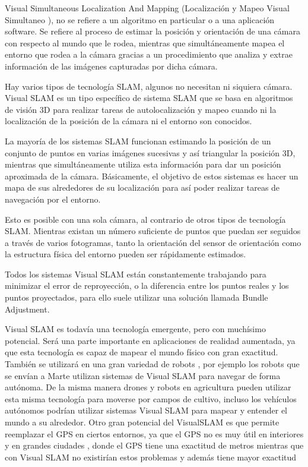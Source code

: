 Visual Simultaneous Localization And Mapping (Localización y Mapeo Visual Simultaneo ), no se refiere a un algoritmo en particular o a una aplicación software. Se refiere al proceso de estimar la posición y orientación de una cámara con respecto al mundo que le rodea, mientras que simultáneamente mapea el entorno que rodea a la cámara gracias a un procedimiento que analiza y extrae información de las imágenes capturadas por dicha cámara.

Hay varios tipos de tecnología SLAM, algunos no necesitan ni siquiera cámara. Visual SLAM es un tipo específico de sistema SLAM que se basa en algoritmos de visión 3D
para realizar tareas de autolocalización y mapeo cuando ni la localización de la posición de la cámara ni el entorno son conocidos.

La mayoría de los sistemas SLAM funcionan estimando la posición de un conjunto de puntos en varias imágenes sucesivas y así triangular la posición 3D, mientras que simultáneamente utiliza esta información para dar un posición aproximada de la cámara. Básicamente, el objetivo de estos sistemas es hacer un mapa de sus alrededores de su localización para así poder realizar tareas de navegación por el entorno.

Esto es posible con una sola cámara, al contrario de otros tipos de tecnología SLAM. Mientras existan un número suficiente de puntos que puedan ser seguidos a través de varios fotogramas, tanto la orientación del sensor de orientación como la estructura física del entorno pueden ser rápidamente estimados.

Todos los sistemas Visual SLAM están constantemente trabajando para minimizar el error de reproyección, o la diferencia entre los puntos reales y los puntos proyectados, para ello suele utilizar una solución llamada Bundle Adjustment.

Visual SLAM es todavía una tecnología emergente, pero con muchísimo potencial. Será una parte importante en aplicaciones de realidad aumentada, ya que esta tecnología es capaz de mapear el mundo físico con gran exactitud. También se utilizará en una gran variedad de robots , por ejemplo los robots que se envían a Marte utilizan sistemas de Visual SLAM para navegar de forma autónoma. De la misma manera drones y robots en agricultura pueden utilizar esta misma tecnología para moverse por campos de cultivo, incluso los vehículos autónomos podrían utilizar sistemas Visual SLAM para mapear y entender el mundo a su alrededor. Otro gran potencial del VisualSLAM es que permite reemplazar el GPS en ciertos entornos, ya que el GPS no es muy útil en interiores y en grandes ciudades , donde el GPS tiene una exactitud de metros mientras que con Visual SLAM no existirían estos problemas y además tiene mayor exactitud



